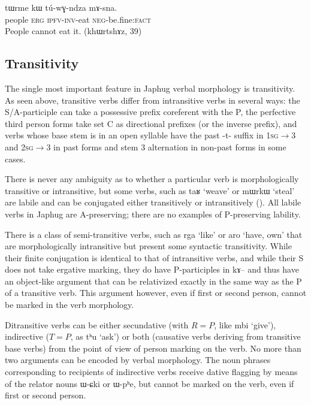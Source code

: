 \documentclass[oldfontcommands,oneside,a4paper,11pt]{article}
\newcommand{\ipa}[1]{{\phon#1}} %
\begin{document}
\begin{exe}
\ex \label{ex:tuwGndza.sna}
\gll
\ipa{tɯrme}  	\ipa{kɯ}  	\ipa{tú-wɣ-ndza}  	\ipa{mɤ-sna.}   \\
people \textsc{erg} \textsc{ipfv-inv}-eat \textsc{neg-}be.fine:\textsc{fact} \\
\glt People cannot eat it. (\ipa{khɯrtshɤz}, 39)
\end{exe}

\subsection{Transitivity}
The single most important feature in Japhug verbal morphology is transitivity. As seen above, transitive verbs differ from intransitive verbs in several ways: the S/A-participle can take a possessive prefix coreferent with the P, the perfective third person forms take set C as directional prefixes (or the inverse prefix), and verbs whose base stem is in an open syllable have the past \ipa{-t-} suffix in \textsc{1sg$\rightarrow$3} and \textsc{2sg$\rightarrow$3} in past forms and stem 3 alternation in non-past forms in some cases.

There is never any ambiguity as to whether a particular verb is morphologically  transitive or intransitive, but some verbs, such as \ipa{taʁ} `weave' or \ipa{mɯrkɯ} `steal' are labile and can be conjugated either transitively or intransitively (\citealt{jacques12demotion}). All labile verbs in Japhug are A-preserving; there are no examples of P-preserving lability.

There is a class of semi-transitive verbs, such as \ipa{rga} `like' or \ipa{aro} `have, own' that are morphologically intransitive but present some syntactic transitivity. While their finite conjugation is identical to that of intransitive verbs, and while their S does not take ergative marking, they do have P-participles in \ipa{kɤ--} and thus have an object-like argument that can be relativized exactly in the same way as the P of a transitive verb. This argument however, even if first or second person, cannot be marked in the verb morphology.

Ditransitive verbs can be either secundative (with $R=P$, like \ipa{mbi} `give'), indirective ($T=P$, as \ipa{tʰu} `ask') or both (causative verbs deriving from transitive base verbs) from the point of view of person marking on the verb. No more than two arguments can be encoded by verbal morphology. The noun phrases corresponding to recipients of indirective verbs receive dative flagging by means of the relator nouns \ipa{ɯ-ɕki} or \ipa{ɯ-pʰe}, but cannot be marked on the verb, even if first or second person.
\end{document}
